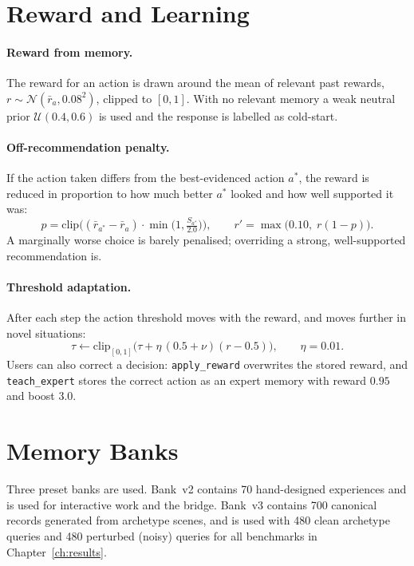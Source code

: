 \documentclass[12pt,a4paper,oneside]{report}
\newcommand{\code}[1]{\texttt{\small #1}}
\begin{document}
\section{Reward and Learning}
\paragraph{Reward from memory.} The reward for an action is drawn around the mean of relevant past rewards, $r \sim \mathcal{N}(\bar r_a, 0.08^2)$, clipped to $[0,1]$. With no relevant memory a weak neutral prior $\mathcal{U}(0.4, 0.6)$ is used and the response is labelled as cold-start.

\paragraph{Off-recommendation penalty.} If the action taken differs from the best-evidenced action $a^*$, the reward is reduced in proportion to how much better $a^*$ looked and how well supported it was:
\begin{equation}
  p = \mathrm{clip}\Big((\bar r_{a^*} - \bar r_a)\cdot \min\big(1, \tfrac{S_{a^*}}{2.0}\big)\Big), \qquad r' = \max\big(0.10,\; r(1-p)\big).
\end{equation}
A marginally worse choice is barely penalised; overriding a strong, well-supported recommendation is.

\paragraph{Threshold adaptation.} After each step the action threshold moves with the reward, and moves further in novel situations:
\begin{equation}
  \tau \leftarrow \mathrm{clip}_{[0,1]}\big(\tau + \eta\,(0.5 + \nu)(r - 0.5)\big), \qquad \eta = 0.01.
\end{equation}
Users can also correct a decision: \code{apply\_reward} overwrites the stored reward, and \code{teach\_expert} stores the correct action as an expert memory with reward $0.95$ and boost $3.0$.

\section{Memory Banks}
Three preset banks are used. Bank~v2 contains 70 hand-designed experiences and is used for interactive work and the bridge. Bank~v3 contains 700 canonical records generated from archetype scenes, and is used with 480 clean archetype queries and 480 perturbed (noisy) queries for all benchmarks in Chapter~\ref{ch:results}.
\end{document}
